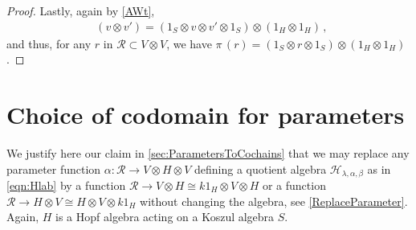 \documentclass[11pt]{amsart}
\numberwithin{equation}{section}
\newcommand{\chabl}{\cH_{\lambda,\alpha,\beta}}
\newcommand{\R}{\mathcal{R}}
\DeclareMathOperator{\AW}{AW}
\DeclareMathOperator{\AWt}{\AW^{\tau}}
\renewcommand{\_}[1]{\mbox{$_{\left( #1 \right)}$}}
\newcommand{\ot}{\otimes}
\newcommand{\cH}{\mathcal{H}}
\begin{document}
{\begin{proof}
%
Lastly, again by \cref{AWt},
$$
\begin{aligned}
  \AWt  (v\ot v') = 
   (1_S\ot v\ot v'\ot 1_S)\ot (1_H\ot 1_H) \, ,
\end{aligned}
$$
and thus,
for any $r$ in $\R\subset V\ot V$,
we have
$    \pi\, (r)
    =
(1_S\ot r \ot 1_S)\ot (1_H\ot 1_H)$.
  \end{proof}

  \section{Choice of codomain for parameters}
  \label{AppendixParameterCodomain}
 
  
  We justify here our claim
  in \cref{sec:ParametersToCochains}
     that we may replace any parameter function
     $\alpha: \R\rightarrow V\ot H\ot V$ defining
     a quotient algebra 
     $\chabl$ 
     as in \cref{eqn:Hlab}
     by a function $\R\rightarrow V\ot H\cong k1_H\ot V \ot H$
    or a function
    $\R\rightarrow H\ot V\cong H\ot V \ot k1_H$ without changing the algebra,
    see \cref{ReplaceParameter}.
    Again, $H$ is a Hopf algebra
     acting on a Koszul algebra $S$. 

}
\end{document}
